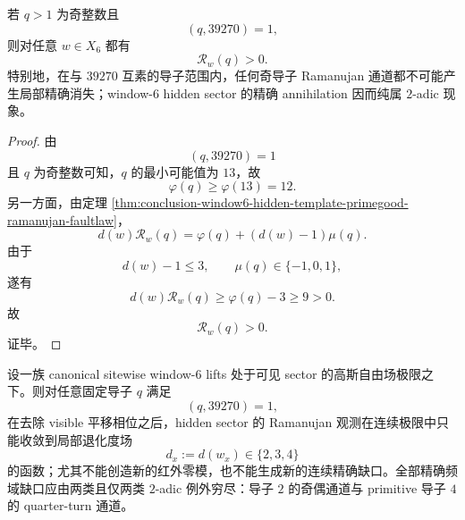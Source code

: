 \begin{proposition}[所有良性奇导子都严格非消失]\label{prop:conclusion-window6-all-good-odd-conductors-strictly-positive}
若 \(q>1\) 为奇整数且
\[
(q,39270)=1,
\]
则对任意 \(w\in X_6\) 都有
\[
\mathcal R_w(q)>0.
\]
特别地，在与 \(39270\) 互素的导子范围内，任何奇导子 Ramanujan 通道都不可能产生局部精确消失；window-\(6\) hidden sector 的精确 annihilation 因而纯属 \(2\)-adic 现象。
\end{proposition}
\begin{proof}
由
\[
(q,39270)=1
\]
且 \(q\) 为奇整数可知，\(q\) 的最小可能值为 \(13\)，故
\[
\varphi(q)\ge \varphi(13)=12.
\]
另一方面，由定理 \ref{thm:conclusion-window6-hidden-template-primegood-ramanujan-faultlaw}，
\[
d(w)\mathcal R_w(q)=\varphi(q)+(d(w)-1)\mu(q).
\]
由于
\[
d(w)-1\le 3,\qquad \mu(q)\in\{-1,0,1\},
\]
遂有
\[
d(w)\mathcal R_w(q)\ge \varphi(q)-3\ge 9>0.
\]
故
\[
\mathcal R_w(q)>0.
\]
证毕。
\end{proof}

\begin{conjecture}\label{conj:conclusion-window6-primegood-ramanujan-channels-only-degeneracy}
设一族 canonical sitewise window-\(6\) lifts 处于可见 sector 的高斯自由场极限之下。则对任意固定导子 \(q\) 满足
\[
(q,39270)=1,
\]
在去除 visible 平移相位之后，hidden sector 的 Ramanujan 观测在连续极限中只能收敛到局部退化度场
\[
d_x:=d(w_x)\in\{2,3,4\}
\]
的函数；尤其不能创造新的红外零模，也不能生成新的连续精确缺口。全部精确频域缺口应由两类且仅两类 \(2\)-adic 例外穷尽：导子 \(2\) 的奇偶通道与 primitive 导子 \(4\) 的 quarter-turn 通道。
\end{conjecture}
